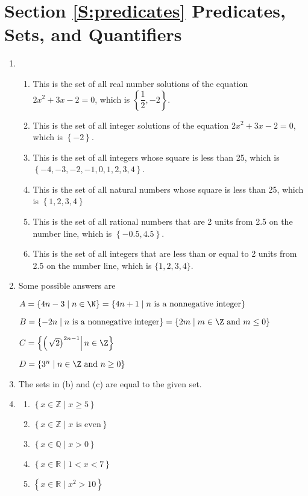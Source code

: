 \section*{Section \ref{S:predicates} Predicates, Sets, and Quantifiers}

\begin{enumerate}
\item \begin{enumerate}
\item This is the set of all real number solutions of the equation $2x^2 + 3x - 2 = 0$, which is $\left\{ {\dfrac{1}{2}, - 2} \right\}$. 
\item This is the set of all integer solutions of the equation $2x^2 + 3x - 2 = 0$, which is $\left\{ {- 2} \right\}$.
\item This is the set of all integers whose square is less than 25, which is 
$\left\{ -4, -3, -2, -1, 0, 1, 2, 3, 4 \right\}$.
\item This is the set of all natural numbers whose square is less than 25, which is 
$\left\{ {1,2,3,4} \right\}$
\item This is the set of all rational numbers that are 2 units from 2.5 on the number line, which is $\left\{ {-0.5,4.5} \right\}$.
\item This is the set of all integers that are less than or equal to 2 units from 2.5 on the number line, which is $\{1, 2, 3, 4\}$.
\end{enumerate}

\item Some possible answers are

$A = \left\{ 4n - 3 \mid n \in \N \right\} = \left\{ 4n + 1 \mid n \text{ is a nonnegative integer} \right\}$

$B = \left\{ -2n \mid n \text{ is a nonnegative integer} \right\} = 
\left\{ 2m \mid m \in \Z \text{ and } m \leq 0 \right\}$

$C = \left\{ \left( \left. \sqrt{2} \right)^{2n-1} \right| n \in \Z  \right\}$

$D = \left\{ 3^n \mid n \in \Z \text{ and } n \geq 0 \right\}$


\item The sets in (b) and (c) are equal to the given set.


\item \begin{multicols}{2}
\begin{enumerate}
\item $\left\{ x\in \mathbb{Z} \mid x \geq 5 \right\}$
\item $\left\{ x\in \mathbb{Z} \mid x \text{ is even} \right\}$
\item $\left\{ x\in \mathbb{Q} \mid x > 0 \right\}$
\item $\left\{ x\in \mathbb{R} \mid  1 < x < 7 \right\}$
\item $\left\{ x\in \mathbb{R} \mid x^2 > 10 \right\}$
\end{enumerate}
\end{multicols}



\end{enumerate}
